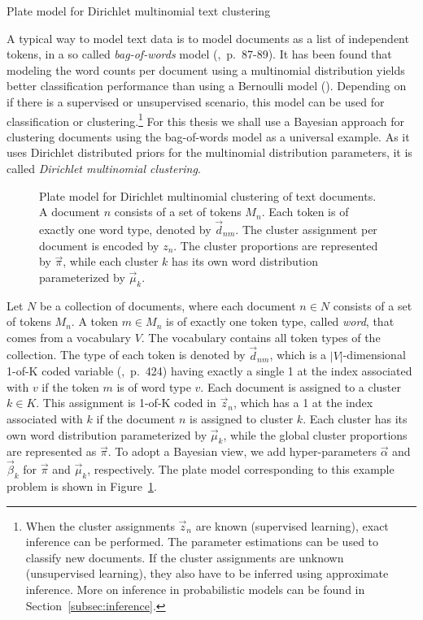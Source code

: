 \begin{Example} Plate model for Dirichlet multinomial text clustering
\label{ex:clustering-pm}

A typical way to model text data is to model documents as a list of independent tokens, in a so called \emph{bag-of-words} model (\cite{murphy2012machine},~p.~87-89). It has been found that modeling the word counts per document using a multinomial distribution yields better classification performance than using a Bernoulli model (\cite{mccallum1998comparison}). Depending on if there is a supervised or unsupervised scenario, this model can be used for classification or clustering.\footnote{When the cluster assignments $\vec z_n$ are known (supervised learning), exact inference can be performed. The parameter estimations can be used to classify new documents. If the cluster assignments are unknown (unsupervised learning), they also have to be inferred using approximate inference. More on inference in probabilistic models can be found in Section~\ref{subsec:inference}.} For this thesis we shall use a Bayesian approach for clustering documents using the bag-of-words model as a universal example. As it uses Dirichlet distributed priors for the multinomial distribution parameters, it is called \emph{Dirichlet multinomial clustering}.

\begin{figure}[t]
	\begin{center}
    	\scalebox{\tikzScale}{\adjustTikzSize }
	\end{center}
\caption[Plate model for Dirichlet multinomial clustering of text documents]{Plate model for Dirichlet multinomial clustering of text documents. A document $n$ consists of a set of tokens $M_n$. Each token is of exactly one word type, denoted by $\vec d_{nm}$. The cluster assignment per document is encoded by $z_n$. The cluster proportions are represented by $\vec \pi$, while each cluster $k$ has its own word distribution parameterized by $\vec \mu_k$.}
		\label{fig:clustering_platemodel}
\end{figure}

Let $N$ be a collection of documents, where each document $n \in N$ consists of a set of tokens $M_n$. A token $m \in M_n$ is of exactly one token type, called \emph{word}, that comes from a vocabulary $V$. The vocabulary contains all token types of the collection. The type of each token is denoted by $\vec d_{nm}$, which is a $|V|$-dimensional 1-of-K coded variable (\cite{bishop2006pattern},~p.~424) having exactly a single 1 at the index associated with $v$ if the token $m$ is of word type $v$. Each document is assigned to a cluster $k \in K$. This assignment is 1-of-K coded in $\vec z_{n}$, which has a 1 at the index associated with $k$ if the document $n$ is assigned to cluster $k$. Each cluster has its own word distribution parameterized by $\vec \mu_k$, while the global cluster proportions are represented as $\vec \pi$. To adopt a Bayesian view, we add hyper-parameters $\vec \alpha$ and $\vec \beta_k$ for $\vec \pi$ and $\vec \mu_k$, respectively. The plate model corresponding to this example problem is shown in Figure~\ref{fig:clustering_platemodel}.


\end{Example}
